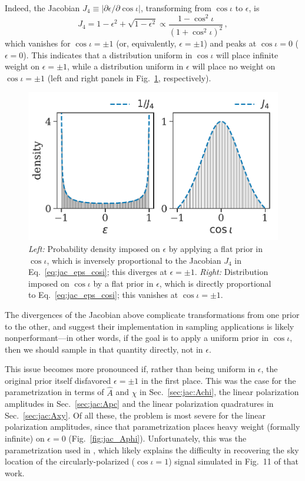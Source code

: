 \documentclass[aps,prd,twocolumn,superscriptaddress,preprintnumbers,floatfix,nofootinbib]{revtex4-2}
\newcommand*{\eq}[1]{Eq.~\eqref{eq:#1}}
\begin{document}
Indeed, the Jacobian $J_4 \equiv \left|\partial\epsilon/\partial \cos\iota\right|$, transforming from $\cos\iota$ to $\epsilon$, is
\begin{equation} \label{eq:jac_eps_cosi}
J_4 =1 - \epsilon^2 + \sqrt{1-\epsilon^2} 
\propto \frac{1 - \cos^2\iota}{\left(1+\cos^2\iota\right)^2} \, ,
\end{equation}
which vanishes for $\cos\iota = \pm 1$ (or, equivalently, $\epsilon = \pm 1$) and peaks at $\cos\iota = 0$ ($\epsilon= 0$).
This indicates that a distribution uniform in $\cos\iota$ will place infinite weight on $\epsilon = \pm 1$, while a distribution uniform in $\epsilon$ will place no weight on $\cos\iota = \pm 1$ (left and right panels in Fig.~\ref{fig:jac_cosi}, respectively).

\begin{figure}
\includegraphics[width=\columnwidth]{jac_eps_cosi}
\caption{\emph{Left:} Probability density imposed on $\epsilon$ by applying a flat prior in $\cos\iota$, which is inversely proportional to the Jacobian $J_4$ in \eq{jac_eps_cosi}; this diverges at $\epsilon = \pm 1$.
\emph{Right:} Distribution imposed on $\cos\iota$ by a flat prior in $\epsilon$, which is directly proportional to \eq{jac_eps_cosi}; this vanishes at $\cos\iota = \pm 1$.
}
\label{fig:jac_cosi}
\end{figure}

The divergences of the Jacobian above complicate transformations from one prior to the other, and suggest their implementation in sampling applications is likely nonperformant---in other words, if the goal is to apply a uniform prior in $\cos\iota$, then we should sample in that quantity directly, not in $\epsilon$.

This issue becomes more pronounced if, rather than being uniform in $\epsilon$, the original prior itself disfavored $\epsilon = \pm 1$ in the first place.
This was the case for the parametrization in terms of $\hat{A}$ and $\chi$ in Sec.~\ref{sec:jac:Achi}, the linear polarization amplitudes in Sec.~\ref{sec:jac:Apc} and the linear polarization quadratures in Sec.~\ref{sec:jac:Axy}.
Of all these, the problem is most severe for the linear polarization amplitudes, since that parametrization places heavy weight (formally infinite) on $\epsilon = 0$ (Fig.~\ref{fig:jac_Aphi}).
Unfortunately, this was the parametrization used in \cite{Chatziioannou:2021mij}, which likely explains the difficulty in recovering the sky location of the circularly-polarized ($\cos\iota=1$) signal simulated in Fig.~11 of that work.
\end{document}

